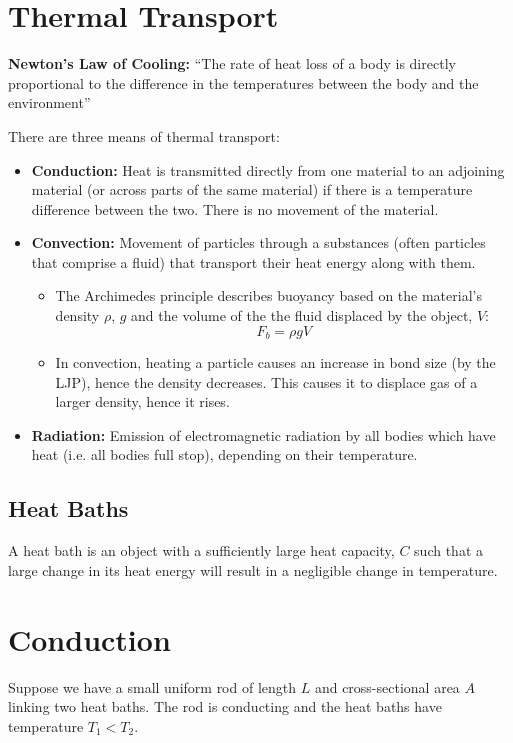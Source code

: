 \section{Thermal Transport}
\begin{tcolorbox}
    \textbf{Newton's Law of Cooling:} ``The rate of heat loss of a body is directly proportional to the difference in the temperatures between the body and the environment''
\end{tcolorbox}

There are three means of thermal transport:
\begin{itemize}
    \item \textbf{Conduction:} Heat is transmitted directly from one material to an adjoining material (or across parts of the same material) if there is a temperature difference between the two. There is no movement of the material.
    \item \textbf{Convection: } Movement of particles through a substances (often particles that comprise a fluid) that transport their heat energy along with them.
    \begin{itemize}
        \item The Archimedes principle describes buoyancy based on the material's density $\rho$, $g$ and the volume of the the fluid displaced by the object, $V$:
        \[
            F_b = \rho g V
        \]

        \item In convection, heating a particle causes an increase in bond size (by the LJP), hence the density decreases. This causes it to displace gas of a larger density, hence it rises.
    \end{itemize}
    \item \textbf{Radiation: }  Emission of electromagnetic radiation by all bodies which have heat (i.e. all bodies full stop), depending on their temperature.
    
\end{itemize}

\subsection{Heat Baths}
A heat bath is an object with a sufficiently large heat capacity, $C$ such that a large change in its heat energy will result in a negligible change in temperature.


\section{Conduction}
Suppose we have a small uniform rod of length $L$ and cross-sectional area $A$ linking two heat baths. The rod is conducting and the heat baths have temperature $T_1 < T_2$.

